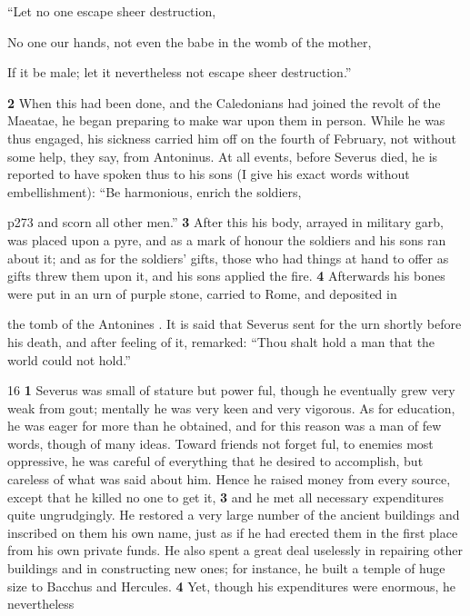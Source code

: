 ``Let no one escape sheer destruction,

No one our hands, not even the babe in the womb of the mother,

If it be male; let it nevertheless not escape sheer destruction.''

\textbf{2} When this had been done, and the Caledonians had joined the revolt of the Maeatae, he began preparing to make war upon them in person. While he was thus engaged, his sickness carried him off on the fourth of February, not without some help, they say, from Antoninus. At all events, before Severus died, he is reported to have spoken thus to his sons (I give his exact words without embellishment): ``Be harmonious, enrich the soldiers,

p273 and scorn all other men.'' \textbf{3} After this his body, arrayed in military garb, was placed upon a pyre, and as a mark of honour the soldiers and his sons ran about it; and as for the soldiers' gifts, those who had things at hand to offer as gifts threw them upon it, and his sons applied the fire. \textbf{4} Afterwards his bones were put in an urn of purple stone, carried to Rome, and deposited in

the tomb of the Antonines . It is said that Severus sent for the urn shortly before his death, and after feeling of it, remarked: ``Thou shalt hold a man that the world could not hold.''

16
\textbf{1} Severus was small of stature but power ­ful, though he eventually grew very weak from gout; mentally he was very keen and very vigorous. As for education, he was eager for more than he obtained, and for this reason was a man of few words, though of many ideas. Toward friends not forget ­ful, to enemies most oppressive, he was careful of everything that he desired to accomplish, but careless of what was said about him. Hence he raised money from every source, except that he killed no one to get it, \textbf{3} and he met all necessary expenditures quite ungrudgingly. He restored a very large number of the ancient buildings and inscribed on them his own name, just as if he had erected them in the first place from his own private funds. He also spent a great deal uselessly in repairing other buildings and in constructing new ones; for instance, he built a temple of huge size to Bacchus and Hercules. \textbf{4} Yet, though his expenditures were enormous, he nevertheless

